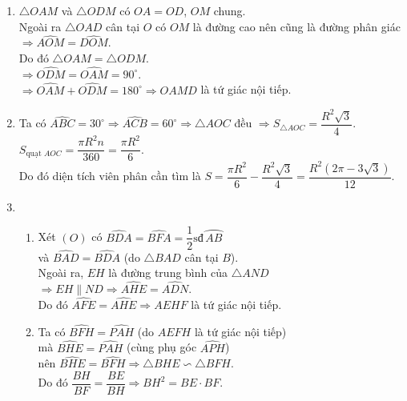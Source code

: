 \begin{ex}
{\begin{center}
\end{center}
\begin{enumerate}
\item $\triangle OAM$ và $\triangle ODM$ có $OA = OD$, $OM$ chung.\\
Ngoài ra $\triangle OAD$ cân tại $O$ có $OM$ là đường cao nên cũng là đường phân giác $\Rightarrow \widehat{AOM} = \widehat{DOM}$.\\
Do đó $\triangle OAM = \triangle ODM$.\\
$\Rightarrow \widehat{ODM} = \widehat{OAM} = 90^\circ$.\\
$\Rightarrow \widehat{OAM} + \widehat{ODM} = 180^\circ \Rightarrow OAMD$ là tứ giác nội tiếp.
\item Ta có $\widehat{ABC} = 30^\circ \Rightarrow \widehat{ACB} = 60^\circ \Rightarrow \triangle AOC$ đều $\Rightarrow S_{\triangle AOC} = \dfrac{R^2\sqrt{3}}{4}$.\\
$S_{\text{quạt }AOC} = \dfrac{\pi R^2n}{360} = \dfrac{\pi R^2}{6}$.\\
Do đó diện tích viên phân cần tìm là $S = \dfrac{\pi R^2}{6} - \dfrac{R^2\sqrt{3}}{4} = \dfrac{R^2(2\pi - 3\sqrt{3})}{12}$.
\item 
\begin{enumerate}
\item Xét $(O)$ có $\widehat{BDA} = \widehat{BFA} = \dfrac{1}{2}\text{sđ}\,\wideparen{AB}$\\
và $\widehat{BAD} = \widehat{BDA}$ (do $\triangle BAD$ cân tại $B$).\\
Ngoài ra, $EH$ là đường trung bình của $\triangle AND$\\
$\Rightarrow EH \parallel ND \Rightarrow \widehat{AHE} = \widehat{ADN}$.\\
Do đó $\widehat{AFE} = \widehat{AHE} \Rightarrow AEHF$ là tứ giác nội tiếp.
\item Ta có $\widehat{BFH} = \widehat{PAH}$ (do $AEFH$ là tứ giác nội tiếp)\\
mà $\widehat{BHE} = \widehat{PAH}$ (cùng phụ góc $\widehat{APH}$)\\
nên $\widehat{BHE} = \widehat{BFH} \Rightarrow \triangle BHE \backsim \triangle BFH$.\\
Do đó $\dfrac{BH}{BF} = \dfrac{BE}{BH} \Rightarrow BH^2 = BE \cdot BF$.\\

\end{enumerate}
\end{enumerate}}
\end{ex}

